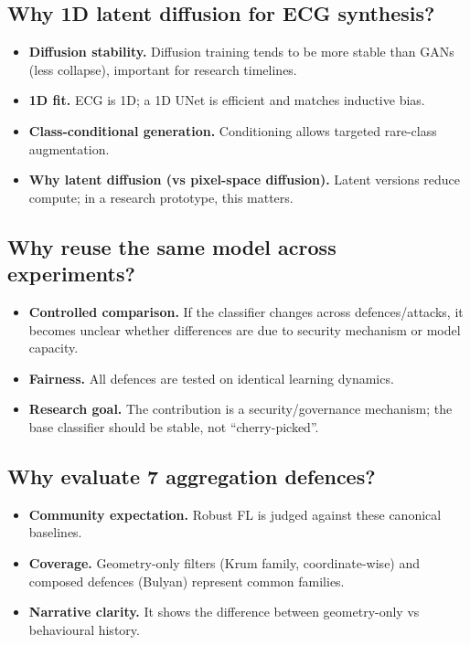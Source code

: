 \documentclass[11pt,a4paper]{article}
\begin{document}
\subsection{Why 1D latent diffusion for ECG synthesis?}
\begin{itemize}
\item \textbf{Diffusion stability.} Diffusion training tends to be more stable than GANs (less collapse), important for research timelines.
\item \textbf{1D fit.} ECG is 1D; a 1D UNet is efficient and matches inductive bias.
\item \textbf{Class-conditional generation.} Conditioning allows targeted rare-class augmentation.
\item \textbf{Why latent diffusion (vs pixel-space diffusion).} Latent versions reduce compute; in a research prototype, this matters.
\end{itemize}

\subsection{Why reuse the same model across experiments?}
\begin{itemize}
\item \textbf{Controlled comparison.} If the classifier changes across defences/attacks, it becomes unclear whether differences are due to security mechanism or model capacity.
\item \textbf{Fairness.} All defences are tested on identical learning dynamics.
\item \textbf{Research goal.} The contribution is a security/governance mechanism; the base classifier should be stable, not ``cherry-picked''.
\end{itemize}

\subsection{Why evaluate 7 aggregation defences?}
\begin{itemize}
\item \textbf{Community expectation.} Robust FL is judged against these canonical baselines.
\item \textbf{Coverage.} Geometry-only filters (Krum family, coordinate-wise) and composed defences (Bulyan) represent common families.
\item \textbf{Narrative clarity.} It shows the difference between geometry-only vs behavioural history.
\end{itemize}
\end{document}
